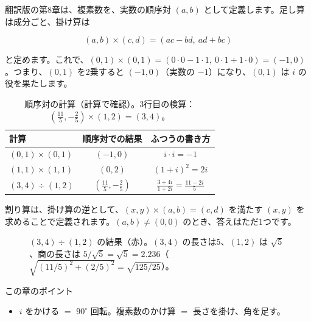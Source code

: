 \documentclass[a4paper,11pt,openany]{ltjsbook}
\begin{document}
翻訳版の第8章は、複素数を、実数の順序対 $(a,b)$ として定義します。足し算は成分ごと、掛け算は

\[
(a,b)\times(c,d)=(ac-bd,\ ad+bc)
\]

と定めます。これで、$(0,1)\times(0,1)=(0\cdot0-1\cdot1,\ 0\cdot1+1\cdot0)=(-1,0)$。つまり、$(0,1)$ を2乗すると $(-1,0)$（実数の $-1$）になり、$(0,1)$ は $i$ の役を果たします。

\begin{table}[htbp]
\centering
\begin{tabular}{lcc}
\toprule
計算 & 順序対での結果 & ふつうの書き方\\
\midrule
$(0,1)\times(0,1)$ & $(-1,0)$ & $i\cdot i=-1$\\
$(1,1)\times(1,1)$ & $(0,2)$ & $(1+i)^2=2i$\\
$(3,4)\div(1,2)$ & $\left(\tfrac{11}5,-\tfrac25\right)$ & $\tfrac{3+4i}{1+2i}=\tfrac{11-2i}{5}$\\
\bottomrule
\end{tabular}
\caption{順序対の計算（計算で確認）。3行目の検算：$\left(\tfrac{11}5,-\tfrac25\right)\times(1,2)=(3,4)$。}
\end{table}

割り算は、掛け算の逆として、$(x,y)\times(a,b)=(c,d)$ を満たす $(x,y)$ を求めることで定義されます。$(a,b)\ne(0,0)$ のとき、答えはただ1つです。

\begin{figure}[htbp]
\centering
{}
\caption{$(3,4)\div(1,2)$ の結果（赤）。$(3,4)$ の長さは5、$(1,2)$ は $\sqrt5$、商の長さは $5/\sqrt5=\sqrt5=2.236$（$\sqrt{(11/5)^2+(2/5)^2}=\sqrt{125/25}$）。}
\end{figure}

\begin{pointbox}{この章のポイント}
\begin{itemize}[leftmargin=1.5em]
\item $i$ をかける $=$ $90^\circ$ 回転。複素数のかけ算 $=$ 長さを掛け、角を足す。
\end{itemize}
\end{pointbox}
\end{document}
